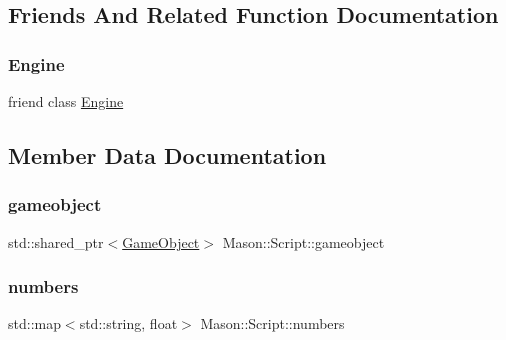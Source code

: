 \subsection{Friends And Related Function Documentation}
\hypertarget{class_mason_1_1_script_a3e1914489e4bed4f9f23cdeab34a43dc}{}\label{class_mason_1_1_script_a3e1914489e4bed4f9f23cdeab34a43dc} 
\subsubsection{\texorpdfstring{Engine}{Engine}}
{\footnotesize\ttfamily friend class \hyperlink{class_mason_1_1_engine}{Engine}\hspace{0.3cm}{\ttfamily [friend]}}



\subsection{Member Data Documentation}
\hypertarget{class_mason_1_1_script_a26ffab9ad2a0f22cb6a3cba3029a985f}{}\label{class_mason_1_1_script_a26ffab9ad2a0f22cb6a3cba3029a985f} 
\subsubsection{\texorpdfstring{gameobject}{gameobject}}
{\footnotesize\ttfamily std\+::shared\+\_\+ptr$<$\hyperlink{class_mason_1_1_game_object}{Game\+Object}$>$ Mason\+::\+Script\+::gameobject}

\hypertarget{class_mason_1_1_script_a39ec15b6842f815f09537f524c0b0786}{}\label{class_mason_1_1_script_a39ec15b6842f815f09537f524c0b0786} 
\subsubsection{\texorpdfstring{numbers}{numbers}}
{\footnotesize\ttfamily std\+::map$<$std\+::string, float$>$ Mason\+::\+Script\+::numbers}

\hypertarget{class_mason_1_1_script_a0b74a1b2b601b05841c95b44b329f859}{}\label{class_mason_1_1_script_a0b74a1b2b601b05841c95b44b329f859} 
